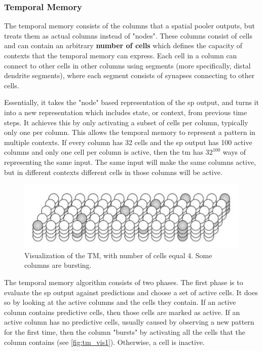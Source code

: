 \subsubsection{Temporal Memory}
\label{sec:temporal_memory}
The temporal memory consists of the columns that a spatial pooler outputs, but treats them as actual columns instead of "nodes". These columns consist of cells and can contain an arbitrary \textbf{number of cells} which defines the capacity of contexts that the temporal memory can express. Each cell in a column can connect to other cells in other columns using segments (more specifically, distal dendrite segments), where each segment consists of synapses connecting to other cells.
\par
Essentially, it takes the "node" based representation of the \gls*{sp} output, and turns it into a new representation which includes state, or context, from previous time steps. It achieves this by only activating a subset of cells per column, typically only one per column. This allows the temporal memory to represent a pattern in multiple contexts. If every column has 32 cells and the \gls*{sp} output has 100 active columns and only one cell per column is active, then the \gls*{tm} has $32^{100}$ ways of representing the same input. The same input will make the same columns active, but in different contexts different cells in those columns will be active.
\begin{figure}[H]
    \centering
    \includegraphics[width=\linewidth]{resources/related_works/tm_vis_alt2}
    \caption[Temporal Memory Visualization]{Visualization of the TM, with number of cells equal 4. Some columns are bursting.}
\end{figure}
\par
The temporal memory algorithm consists of two phases. The first phase is to evaluate the \gls*{sp} output against predictions and choose a set of active cells. It does so by looking at the active columns and the cells they contain. If an active column contains predictive cells, then those cells are marked as active. If an active column has no predictive cells, usually caused by observing a new pattern for the first time, then the column "bursts" by activating all the cells that the column contains (see \autoref{fig:tm_vis1}). Otherwise, a cell is inactive.
